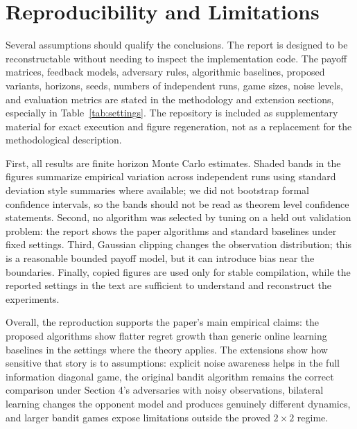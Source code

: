 \documentclass[a4paper,11pt]{article}
\theoremstyle{definition}
\begin{document}
\section{Reproducibility and Limitations}

Several assumptions should qualify the conclusions. The report is designed to be reconstructable without needing to inspect the implementation code. The payoff matrices, feedback models, adversary rules, algorithmic baselines, proposed variants, horizons, seeds, numbers of independent runs, game sizes, noise levels, and evaluation metrics are stated in the methodology and extension sections, especially in Table~\ref{tab:settings}. The repository is included as supplementary material for exact execution and figure regeneration, not as a replacement for the methodological description.

First, all results are finite horizon Monte Carlo estimates. Shaded bands in the figures summarize empirical variation across independent runs using standard deviation style summaries where available; we did not bootstrap formal confidence intervals, so the bands should not be read as theorem level confidence statements. Second, no algorithm was selected by tuning on a held out validation problem: the report shows the paper algorithms and standard baselines under fixed settings. Third, Gaussian clipping changes the observation distribution; this is a reasonable bounded payoff model, but it can introduce bias near the boundaries. Finally, copied figures are used only for stable compilation, while the reported settings in the text are sufficient to understand and reconstruct the experiments.

Overall, the reproduction supports the paper's main empirical claims: the proposed algorithms show flatter regret growth than generic online learning baselines in the settings where the theory applies. The extensions show how sensitive that story is to assumptions: explicit noise awareness helps in the full information diagonal game, the original bandit algorithm remains the correct comparison under Section 4's adversaries with noisy observations, bilateral learning changes the opponent model and produces genuinely different dynamics, and larger bandit games expose limitations outside the proved $2\times2$ regime.



\end{document}
